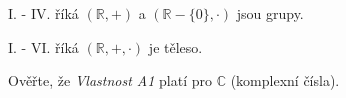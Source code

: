 I. - IV. říká $(\mathbb{R}, +)$ a $(\mathbb{R} - \{0\}, \cdot)$ jsou grupy.

I. - VI. říká $(\mathbb{R}, +, \cdot)$ je těleso.

Ověřte, že \textit{Vlastnost A1} platí pro $\mathbb{C}$ (komplexní čísla).

